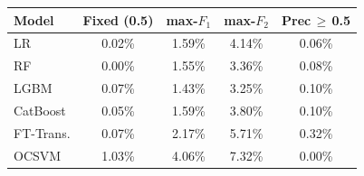 \begin{tabular}{l c c c c}
\toprule
Model & Fixed (0.5) & max-$F_1$ & max-$F_2$ & Prec\,$\geq$\,0.5 \\
\midrule
LR         & 0.02\% & 1.59\% & 4.14\% & 0.06\% \\
RF         & 0.00\% & 1.55\% & 3.36\% & 0.08\% \\
LGBM       & 0.07\% & 1.43\% & 3.25\% & 0.10\% \\
CatBoost   & 0.05\% & 1.59\% & 3.80\% & 0.10\% \\
FT-Trans.  & 0.07\% & 2.17\% & 5.71\% & 0.32\% \\
OCSVM      & 1.03\% & 4.06\% & 7.32\% & 0.00\% \\
\bottomrule
\end{tabular}
